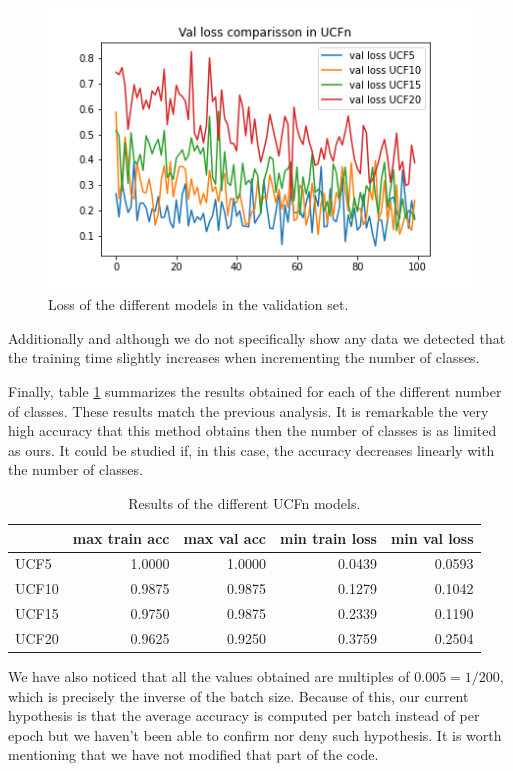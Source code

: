 \documentclass[letterpaper, 10 pt, conference]{ieeeconf}
\begin{document}
\begin{figure}[]
    \centering
    \includegraphics[scale=0.6]{Figures/UCF_val_loss_comparisson.png}
    \caption{Loss of the different models in the validation set.}
    \label{fig:val:loss}
\end{figure}

Additionally and although we do not specifically show any data we detected that the training time slightly increases when incrementing the number of classes.

Finally, table \ref{tab:results2} summarizes the results obtained for each of the different number of classes. These results match the previous analysis. It is remarkable the very high accuracy that this method obtains then the number of classes is as limited as ours. It could be studied if, in this case, the accuracy decreases linearly with the number of classes.

\begin{table}[H]
    \begin{tabular}{l|rrrr}
          & max train acc & max val acc & min train loss & min val loss \\ \hline
    UCF5  & 1.0000      & 1.0000 & 0.0439         & 0.0593       \\
    UCF10 & 0.9875        & 0.9875      & 0.1279         & 0.1042       \\
    UCF15 & 0.9750        & 0.9875      & 0.2339         & 0.1190       \\
    UCF20 & 0.9625        & 0.9250      & 0.3759         & 0.2504      
    \end{tabular}
    \caption{Results of the different UCFn models.}
    \label{tab:results2}
\end{table}

We have also noticed that all the values obtained are multiples of $0.005 = 1/200$, which is precisely the inverse of the batch size. Because of this, our current hypothesis is that the average accuracy is computed per batch instead of per epoch but we haven't been able to confirm nor deny such hypothesis. It is worth mentioning that we have not modified that part of the code.
\end{document}
